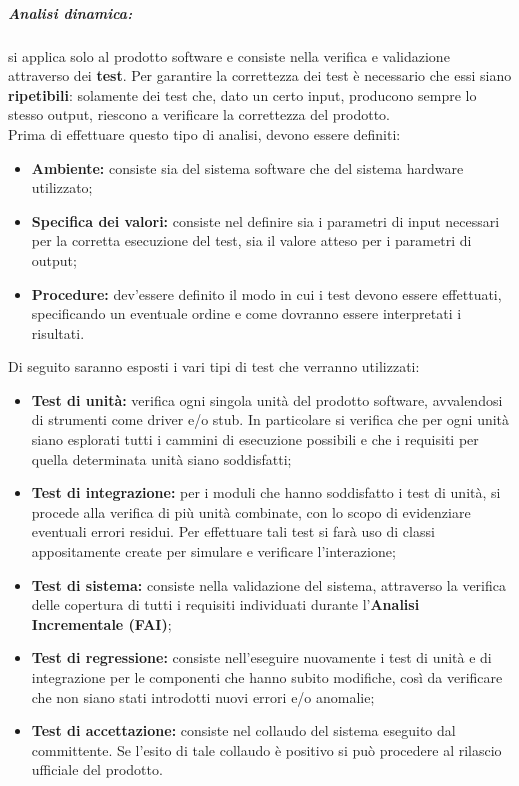 \subparagraph{Analisi dinamica:} si applica solo al prodotto software e consiste nella verifica e validazione attraverso dei \textbf{test}. Per garantire la correttezza dei test è necessario che essi siano \textbf{ripetibili}: solamente dei test che, dato un certo input, producono sempre lo stesso output, riescono a verificare la correttezza del prodotto.
\\Prima di effettuare questo tipo di analisi, devono essere definiti:
\begin{itemize}
	\item \textbf{Ambiente:} consiste sia del sistema software che del sistema hardware utilizzato;
	\item \textbf{Specifica dei valori:} consiste nel definire sia i parametri di input necessari per la corretta esecuzione del test, sia il valore atteso per i parametri di output;
	\item \textbf{Procedure:} dev'essere definito il modo in cui i test devono essere effettuati, specificando un eventuale ordine e come dovranno essere interpretati i risultati.
\end{itemize}
	
Di seguito saranno esposti i vari tipi di test che verranno utilizzati:
\begin{itemize}
	\item \textbf{Test di unità:} verifica ogni singola unità del prodotto software, avvalendosi di strumenti come driver\glossario{} e/o stub\glossario{}. In particolare si verifica che per ogni unità siano esplorati tutti i cammini di esecuzione possibili e che i requisiti per quella determinata unità siano soddisfatti;
	\item \textbf{Test di integrazione:} per i moduli che hanno soddisfatto i test di unità, si procede alla verifica di più unità combinate, con lo scopo di evidenziare eventuali errori residui. Per effettuare tali test si farà uso di classi appositamente create per simulare e verificare l'interazione;
	\item \textbf{Test di sistema:} consiste nella validazione del sistema, attraverso la verifica delle copertura di tutti i requisiti individuati durante l'\textbf{Analisi Incrementale (FAI)};
	\item \textbf{Test di regressione:} consiste nell'eseguire nuovamente i test di unità e di integrazione per le componenti che hanno subito modifiche, così da verificare che non siano stati introdotti nuovi errori e/o anomalie;
	\item \textbf{Test di accettazione:} consiste nel collaudo del sistema eseguito dal committente. Se l'esito di tale collaudo è positivo si può procedere al rilascio ufficiale del prodotto.
\end{itemize}

